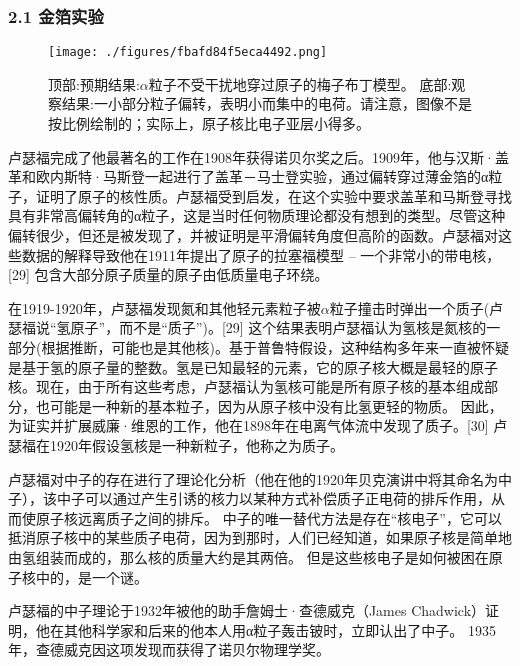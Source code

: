 \subsubsection{2.1 金箔实验}
\begin{figure}[ht]
\centering
\texttt{[image: ./figures/fbafd84f5eca4492.png]}
\caption{顶部:预期结果:$\alpha$粒子不受干扰地穿过原子的梅子布丁模型。 底部:观察结果:一小部分粒子偏转，表明小而集中的电荷。请注意，图像不是按比例绘制的；实际上，原子核比电子亚层小得多。} \label{fig_Ernest_5}
\end{figure}
卢瑟福完成了他最著名的工作在1908年获得诺贝尔奖之后。1909年，他与汉斯·盖革和欧内斯特·马斯登一起进行了盖革－马士登实验，通过偏转穿过薄金箔的α粒子，证明了原子的核性质。卢瑟福受到启发，在这个实验中要求盖革和马斯登寻找具有非常高偏转角的α粒子，这是当时任何物质理论都没有想到的类型。尽管这种偏转很少，但还是被发现了，并被证明是平滑偏转角度但高阶的函数。卢瑟福对这些数据的解释导致他在1911年提出了原子的拉塞福模型 – 一个非常小的带电核，[29] 包含大部分原子质量的原子由低质量电子环绕。

在1919-1920年，卢瑟福发现氮和其他轻元素粒子被$\alpha$粒子撞击时弹出一个质子(卢瑟福说“氢原子”，而不是“质子”)。[29] 这个结果表明卢瑟福认为氢核是氮核的一部分(根据推断，可能也是其他核)。基于普鲁特假设，这种结构多年来一直被怀疑是基于氢的原子量的整数。氢是已知最轻的元素，它的原子核大概是最轻的原子核。现在，由于所有这些考虑，卢瑟福认为氢核可能是所有原子核的基本组成部分，也可能是一种新的基本粒子，因为从原子核中没有比氢更轻的物质。 因此，为证实并扩展威廉·维恩的工作，他在1898年在电离气体流中发现了质子。[30] 卢瑟福在1920年假设氢核是一种新粒子，他称之为质子。

卢瑟福对中子的存在进行了理论化分析（他在他的1920年贝克演讲中将其命名为中子），该中子可以通过产生引诱的核力以某种方式补偿质子正电荷的排斥作用，从而使原子核远离质子之间的排斥。 中子的唯一替代方法是存在“核电子”，它可以抵消原子核中的某些质子电荷，因为到那时，人们已经知道，如果原子核是简单地由氢组装而成的，那么核的质量大约是其两倍。 但是这些核电子是如何被困在原子核中的，是一个谜。

卢瑟福的中子理论于1932年被他的助手詹姆士·查德威克（James Chadwick）证明，他在其他科学家和后来的他本人用α粒子轰击铍时，立即认出了中子。 1935年，查德威克因这项发现而获得了诺贝尔物理学奖。